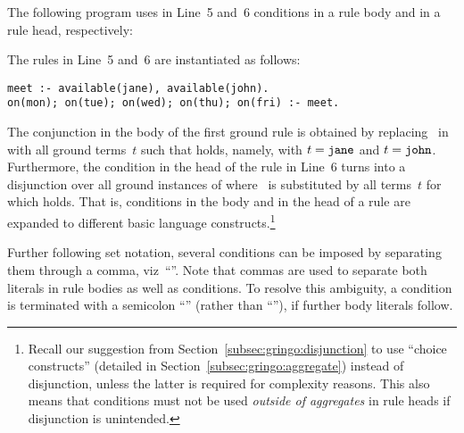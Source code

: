 \begin{example}\label{ex:cond}
The following program uses in Line~5 and~6 conditions in a rule body and in a rule head, respectively:
%

%
The rules in Line~5 and~6 are instantiated as follows:%
\begin{lstlisting}[numbers=none]
meet :- available(jane), available(john).
on(mon); on(tue); on(wed); on(thu); on(fri) :- meet.
\end{lstlisting}
%
The conjunction in the body of the first ground rule is obtained by replacing~ in
 with all ground terms~$t$ such that
 holds, namely, with $t=\texttt{jane}$ and $t=\texttt{john}$.
Furthermore, the condition in the head of the rule in Line~6 turns into
a disjunction over all ground instances of
 where~ is substituted by all terms~$t$
for which  holds.
That is, conditions in the body and in the head of a rule
are expanded to different basic language constructs.\footnote{%
Recall our suggestion from Section~\ref{subsec:gringo:disjunction}
to use ``choice constructs'' (detailed in Section~\ref{subsec:gringo:aggregate})
instead of disjunction, unless the latter is required for complexity reasons.
This also means that conditions must 
not be used \emph{outside of aggregates} in rule heads
if disjunction is unintended.}
\eexample
\end{example}

Further following set notation,
several conditions can be imposed by separating them through a comma, viz~``\code{,}''.
Note that commas are used to separate both literals in rule bodies as well as conditions.
To resolve this ambiguity, 
a condition is terminated with a semicolon ``\code{;}'' (rather than ``\code{,}''), if further body literals follow.

